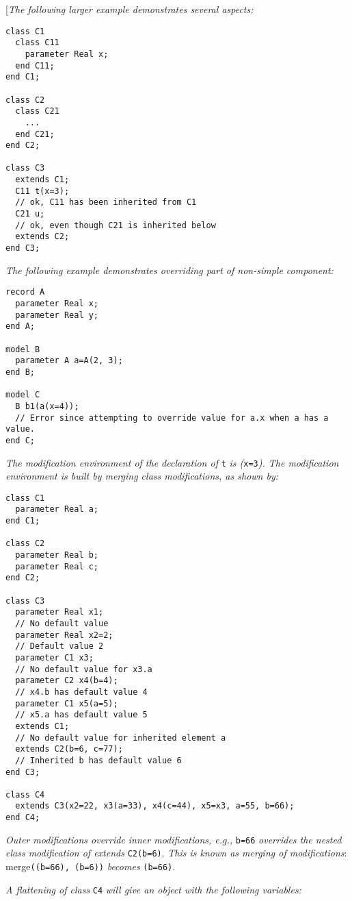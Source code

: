 {[}\emph{The following larger example demonstrates several aspects:}
\begin{lstlisting}[language=modelica]
class C1
  class C11
    parameter Real x;
  end C11;
end C1;

class C2
  class C21
    ...
  end C21;
end C2;

class C3
  extends C1;
  C11 t(x=3);
  // ok, C11 has been inherited from C1
  C21 u;
  // ok, even though C21 is inherited below
  extends C2;
end C3;
\end{lstlisting}
\emph{The following example demonstrates overriding part of non-simple
component: }
\begin{lstlisting}[language=modelica]
record A
  parameter Real x;
  parameter Real y;
end A;

model B
  parameter A a=A(2, 3);
end B;

model C
  B b1(a(x=4));
  // Error since attempting to override value for a.x when a has a value.
end C;
\end{lstlisting}

\emph{The modification environment of the declaration of} \lstinline!t! \emph{is
(}\lstinline!x=3!\emph{). The modification environment is built by merging class
modifications, as shown by: }
\begin{lstlisting}[language=modelica]
class C1
  parameter Real a;
end C1;

class C2
  parameter Real b;
  parameter Real c;
end C2;

class C3
  parameter Real x1;
  // No default value
  parameter Real x2=2;
  // Default value 2
  parameter C1 x3;
  // No default value for x3.a
  parameter C2 x4(b=4);
  // x4.b has default value 4
  parameter C1 x5(a=5);
  // x5.a has default value 5
  extends C1;
  // No default value for inherited element a
  extends C2(b=6, c=77);
  // Inherited b has default value 6
end C3;

class C4
  extends C3(x2=22, x3(a=33), x4(c=44), x5=x3, a=55, b=66);
end C4;
\end{lstlisting}

\emph{Outer modifications override inner modifications, e.g.,} \lstinline!b=66!
\emph{overrides the nested class modification of extends} \lstinline!C2(b=6)!.
\emph{This is known as merging of modifications}: merge\lstinline!((b=66), (b=6))!
\emph{becomes} \lstinline!(b=66)!.

\emph{A flattening of class} \lstinline!C4! \emph{will give an object with the
following variables: }

